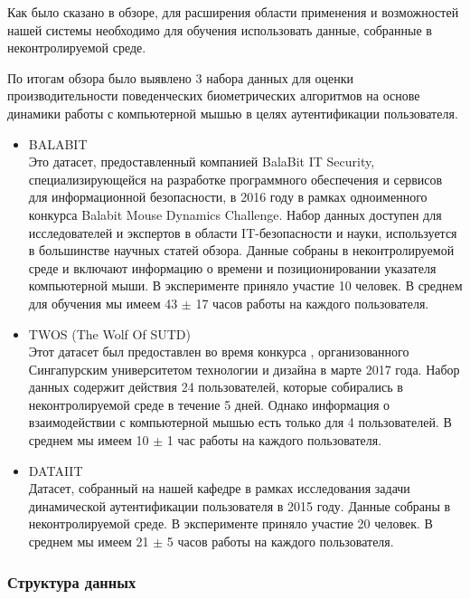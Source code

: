 \documentclass[12pt]{article}
\begin{document}
    \par Как было сказано в обзоре, для расширения области применения и возможностей нашей системы необходимо для обучения использовать данные, собранные в неконтролируемой среде.

    \par По итогам обзора было выявлено 3 набора данных для оценки производительности поведенческих биометрических алгоритмов на основе динамики работы с компьютерной мышью в целях аутентификации пользователя.

    \begin{itemize}
        \item \textsc{BALABIT} \cite{BALABIT} \\
        Это датасет, предоставленный компанией BalaBit IT Security, специализирующейся на разработке программного обеспечения и сервисов для информационной безопасности, в 2016 году в рамках одноименного конкурса Balabit Mouse Dynamics Challenge. Набор данных доступен для исследователей и экспертов в области IT-безопасности и науки, используется в большинстве научных статей обзора. Данные собраны в неконтролируемой среде и включают информацию о времени и позиционировании указателя компьютерной мыши. В эксперименте приняло участие 10 человек. В среднем для обучения мы имеем 43 $\pm$ 17 часов работы на каждого пользователя.

        \item \textsc{TWOS} (The Wolf Of SUTD) \cite{TWOS} \\
        Этот датасет был предоставлен во время конкурса , организованного Сингапурским университетом технологии и дизайна в марте 2017 года. Набор данных содержит действия 24 пользователей, которые собирались в неконтролируемой среде в течение 5 дней. Однако информация о взаимодействии с компьютерной мышью есть только для 4 пользователей. В среднем мы имеем 10 $\pm$ 1 час работы на каждого пользователя.

        \item \textsc{DATAIIT} \\
        Датасет, собранный на нашей кафедре в рамках исследования задачи динамической аутентификации пользователя в 2015 году. Данные собраны в неконтролируемой среде. В эксперименте приняло участие 20 человек. В среднем мы имеем 21 $\pm$ 5 часов работы на каждого пользователя.
    \end{itemize}


    \subsubsection{Структура данных}
    \label{sec:Research:Data:Struct}
    
\end{document}
